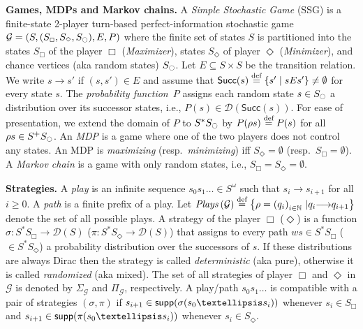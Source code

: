 \documentclass[a4paper,UKenglish,cleveref,autoref,thm-restate]{lipics-v2021}
\DeclarePairedDelimiter{\set}{\{}{\}}
\newcommand{\+}[1]{\mathbb{#1}}
\newcommand{\?}[1]{\mathcal{#1}}
\newcommand{\N}{\+{N}}
\newcommand{\x}{\times}
\newcommand{\rsymbol}{\ocircle}
\newcommand{\zsymbol}{\Box}
\newcommand{\osymbol}{\Diamond}
\newcommand{\xsymbol}{\odot}
\newcommand{\zstates}{\states_\zsymbol}
\newcommand{\rstates}{\states_\rsymbol}
\newcommand{\ostates}{\states_\osymbol}
\newcommand{\eqby}[2][=]{\stackrel{\text{{\tiny{#2}}}}{#1}}
\newcommand{\eqdef}{\eqby{def}}
\newcommand{\dist}{\mathcal{D}}
\newcommand{\supp}{{\sf supp}}
\newcommand{\obj}{\mathtt{O}}
\newcommand{\lrc}[1]{\left(#1\right)}
\newcommand{\tuple}[1]{\lrc{#1}}
\newcommand{\game}{{\mathcal G}}
\newcommand{\gametuple}{\tuple{\states,(\zstates,\ostates,\rstates),\transition,\probp}}
\newcommand{\states}{S}
\newcommand{\s}{s}
\newcommand{\transition}{{E}}
\newcommand{\movesto}{{\longrightarrow}}
\newcommand{\probp}{P}
\newcommand{\play}{\rho}
\newcommand{\playsof}[1]{{\it Plays}\lrc{#1}}
\newcommand{\partialplay}{\rho}
\newcommand{\zstrat}{\sigma}
\newcommand{\ostrat}{\pi}
\newcommand{\zallstrats}[1]{\zstratset_{{#1}}}
\newcommand{\oallstrats}[1]{\ostratset_{{#1}}}
\newcommand{\zstratset}{\Sigma}
\newcommand{\ostratset}{\Pi}
\newcommand{\px}{\xsymbol}
\newcommand{\pz}{\zsymbol}
\newcommand{\po}{\osymbol}
\newcommand{\successors}[1]{\mathsf{Succ}({#1})}
\begin{document}
\textbf{Games, MDPs and Markov chains.}
A \emph{Simple Stochastic Game} (SSG) is a finite-state 2-player turn-based
perfect-information stochastic game $\game = \gametuple$
where the finite set of states $\states$ is partitioned into the states $\zstates$ of
the player $\pz$ (\emph{Maximizer}),
states $\ostates$ of player $\po$ (\emph{Minimizer}),
and chance vertices (aka random states) $\rstates$.
Let $\transition \subseteq \states \x \states$ be the transition relation.
We write $\s \movesto \s'$ if $\tuple{\s,\s'} \in \transition$ and
assume that
$\successors{\s} \eqdef \{\s' \mid \s\transition{}\s'\} \neq \emptyset$
for every state $\s$.
The \emph{probability function}~$\probp$
assigns each random state $\s \in \rstates$ a distribution over
its successor states, i.e., $\probp(\s) \in \dist(\successors{\s})$.
For ease of presentation, we extend the domain of $\probp$ to
$\states^*\rstates$ by $\probp(\partialplay\s) \eqdef \probp(\s)$
for all $\partialplay\s \in \states^+\rstates$.
An \emph{MDP} is a game where one of the two players does not control any
states. An MDP is \emph{maximizing} (resp.\ \emph{minimizing})
iff $\ostates = \emptyset$ (resp.\ $\zstates = \emptyset$).
A \emph{Markov chain} is a game with only random states,
i.e., $\zstates = \ostates = \emptyset$.

\textbf{Strategies.}
A \textit{play} is an infinite sequence $\s_0\s_1 \ldots \in \states^{\omega}$
such that $\s_i \movesto \s_{i+1}$ for all $i \ge 0$.
A \textit{path} is a finite prefix of a play.
Let $\playsof{\game} \eqdef \set*{\play = \lrc{q_i}_{i \in \N} \, | q_i \movesto q_{i+1}}$
denote the set of all possible plays.
A strategy of the player $\pz$ ($\po$) is a function
$\zstrat : \states^* \zstates \to \dist(\states)$
($\ostrat : \states^* \ostates \to \dist(\states)$)
that assigns to every path
$w\s \in \states^* \zstates$ ($\in \states^* \ostates$)
a probability distribution over the successors of $\s$.
If these distributions are always Dirac then the strategy is called
\emph{deterministic} (aka pure), otherwise it is called \emph{randomized}
(aka mixed).
The set of all strategies of player $\pz$ and $\po$ in
$\game$ is denoted by $\zallstrats{\game}$ and $\oallstrats{\game}$,
respectively.
A play/path $\s_0\s_1 \ldots$ is compatible with a pair of strategies
$(\zstrat,\ostrat)$ if $\s_{i+1} \in \supp(\zstrat(\s_0 \ldots \s_i))$
whenever $\s_i \in \zstates$ and
$\s_{i+1} \in \supp(\ostrat(\s_0 \ldots \s_i))$ whenever $\s_i \in \ostates$.
\end{document}

